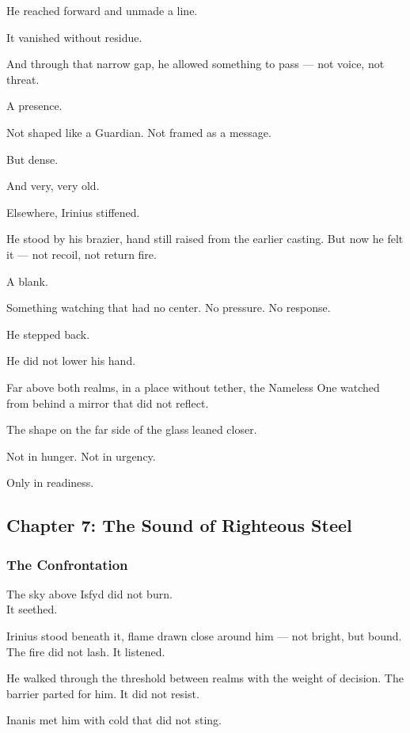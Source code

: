 \documentclass[12pt]{article}
\begin{document}
He reached forward and unmade a line.

It vanished without residue.

And through that narrow gap, he allowed something to pass — not voice, not threat.

A presence.

Not shaped like a Guardian. Not framed as a message.

But dense.

And very, very old.

Elsewhere, Irinius stiffened.

He stood by his brazier, hand still raised from the earlier casting. But now he felt it — not recoil, not return fire.

A blank.

Something watching that had no center. No pressure. No response.

He stepped back.

He did not lower his hand.

Far above both realms, in a place without tether, the Nameless One watched from behind a mirror that did not reflect.

The shape on the far side of the glass leaned closer.

Not in hunger. Not in urgency.

Only in readiness.

\newpage

\subsection{Chapter 7: The Sound of Righteous Steel}

\vspace{.5in}

\subsubsection{The Confrontation}

The sky above Isfyd did not burn.\\
It seethed.

Irinius stood beneath it, flame drawn close around him — not bright, but bound. The fire did not lash. It listened.

He walked through the threshold between realms with the weight of decision. The barrier parted for him. It did not resist.

Inanis met him with cold that did not sting.
\end{document}
